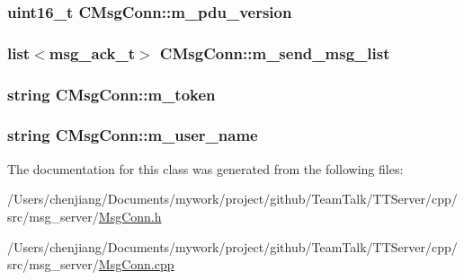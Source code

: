 \subsubsection[{m\+\_\+pdu\+\_\+version}]{\setlength{\rightskip}{0pt plus 5cm}uint16\+\_\+t C\+Msg\+Conn\+::m\+\_\+pdu\+\_\+version\hspace{0.3cm}{\ttfamily [private]}}\label{class_c_msg_conn_ae6d0279c7519fdecceff6503fd425297}
\hypertarget{class_c_msg_conn_ad4124db4d4aa46ef46e464d0eea65c04}{}
\subsubsection[{m\+\_\+send\+\_\+msg\+\_\+list}]{\setlength{\rightskip}{0pt plus 5cm}list$<${\bf msg\+\_\+ack\+\_\+t}$>$ C\+Msg\+Conn\+::m\+\_\+send\+\_\+msg\+\_\+list\hspace{0.3cm}{\ttfamily [private]}}\label{class_c_msg_conn_ad4124db4d4aa46ef46e464d0eea65c04}
\hypertarget{class_c_msg_conn_ae1deaca953c5caf2475b230009ad3754}{}
\subsubsection[{m\+\_\+token}]{\setlength{\rightskip}{0pt plus 5cm}string C\+Msg\+Conn\+::m\+\_\+token\hspace{0.3cm}{\ttfamily [private]}}\label{class_c_msg_conn_ae1deaca953c5caf2475b230009ad3754}
\hypertarget{class_c_msg_conn_af048c59a3512fab443543bf9a01e01e4}{}
\subsubsection[{m\+\_\+user\+\_\+name}]{\setlength{\rightskip}{0pt plus 5cm}string C\+Msg\+Conn\+::m\+\_\+user\+\_\+name\hspace{0.3cm}{\ttfamily [private]}}\label{class_c_msg_conn_af048c59a3512fab443543bf9a01e01e4}


The documentation for this class was generated from the following files\+:\begin{DoxyCompactItemize}
\item 
/\+Users/chenjiang/\+Documents/mywork/project/github/\+Team\+Talk/\+T\+T\+Server/cpp/src/msg\+\_\+server/\hyperlink{_msg_conn_8h}{Msg\+Conn.\+h}\item 
/\+Users/chenjiang/\+Documents/mywork/project/github/\+Team\+Talk/\+T\+T\+Server/cpp/src/msg\+\_\+server/\hyperlink{_msg_conn_8cpp}{Msg\+Conn.\+cpp}\end{DoxyCompactItemize}
